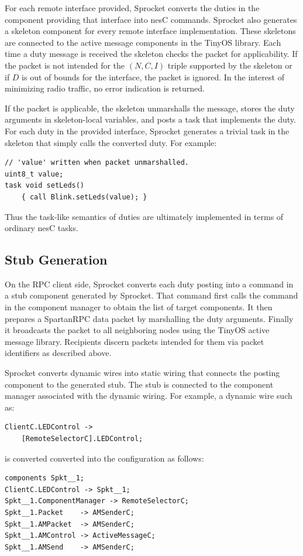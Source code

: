 For each remote interface provided, Sprocket converts the duties in the component providing that
interface into nesC commands. Sprocket also generates a skeleton component for every remote
interface implementation. These skeletons are connected to the active message components in the
TinyOS library. Each time a duty message is received the skeleton checks the packet for
applicability. If the packet is not intended for the $(N, C, I)$ triple supported by the
skeleton or if $D$ is out of bounds for the interface, the packet is ignored. In the interest of
minimizing radio traffic, no error indication is returned.

If the packet is applicable, the skeleton unmarshalls the message, stores the duty arguments in
skeleton-local variables, and posts a task that implements the duty. For each duty in the
provided interface, Sprocket generates a trivial task in the skeleton that simply calls the
converted duty. For example:
\begin{Verbatim}
// 'value' written when packet unmarshalled.
uint8_t value;
task void setLeds()
    { call Blink.setLeds(value); }
\end{Verbatim}
\vspace{0.3em}

Thus the task-like semantics of duties are ultimately implemented in terms of ordinary nesC
tasks.

\subsection{Stub Generation}

On the RPC client side, Sprocket converts each duty posting into a command in a stub component
generated by Sprocket. That command first calls the  command in the component
manager to obtain the list of target components. It then prepares a SpartanRPC data packet by
marshalling the duty arguments. Finally it broadcasts the packet to all neighboring nodes using
the TinyOS active message library. Recipients discern packets intended for them via packet
identifiers as described above.

Sprocket converts dynamic wires into static wiring that connects the posting component to the
generated stub. The stub is connected to the component manager associated with the dynamic
wiring. For example, a dynamic wire such as:
\begin{Verbatim}
ClientC.LEDControl ->
    [RemoteSelectorC].LEDControl;
\end{Verbatim}
is converted converted into the configuration as follows:
\begin{Verbatim}
components Spkt__1;
ClientC.LEDControl -> Spkt__1;
Spkt__1.ComponentManager -> RemoteSelectorC;
Spkt__1.Packet    -> AMSenderC;
Spkt__1.AMPacket  -> AMSenderC;
Spkt__1.AMControl -> ActiveMessageC;
Spkt__1.AMSend    -> AMSenderC;
\end{Verbatim}

